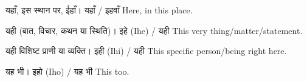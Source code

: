 %
{यहाँ, इस स्थान पर, ईहाँ।}%
{यहाँ / इहवाँ}%
{Here, in this place.}

%
{यही (बात, विचार, कथन या स्थिति)।}%
{इहे (Ihe) / यही}%
{This very thing/matter/statement.}

%
{यही विशिष्ट प्राणी या व्यक्ति।}%
{इही (Ihi) / यही}%
{This specific person/being right here.}

%
{यह भी।}%
{इहो (Iho) / यह भी}%
{This too.}
